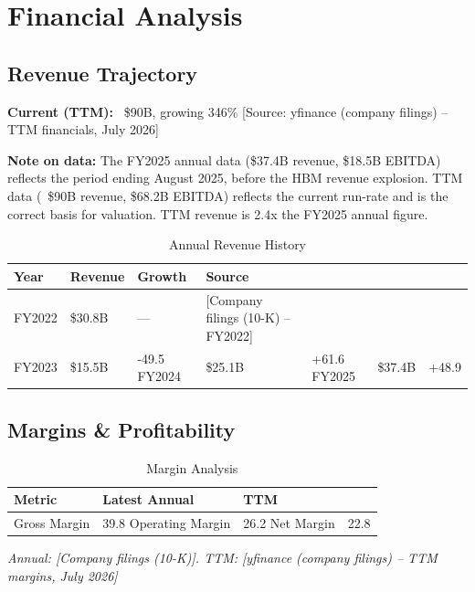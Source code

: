 \documentclass[11pt,a4paper]{report}
\newcommand{\source}[1]{\hfill\small\textit{#1}}
\begin{document}
\chapter{Financial Analysis}

\section{Revenue Trajectory}
\textbf{Current (TTM):} ~\$90B, growing 346\% [Source: yfinance (company filings) -- TTM financials, July 2026]

\textbf{Note on data:} The FY2025 annual data (\$37.4B revenue, \$18.5B EBITDA) reflects the period ending August 2025, before the HBM revenue explosion. TTM data (~\$90B revenue, \$68.2B EBITDA) reflects the current run-rate and is the correct basis for valuation. TTM revenue is 2.4x the FY2025 annual figure.

\begin{table}[H]
\centering
\caption{Annual Revenue History}
\begin{tabularx}{\textwidth}{lC{2.5cm}C{2.5cm}X}
\toprule
\textbf{Year} & \textbf{Revenue} & \textbf{Growth} & \textbf{Source} \\
\midrule
FY2022 & \$30.8B & --- & [Company filings (10-K) -- FY2022] \\
FY2023 & \$15.5B & -49.5%
FY2024 & \$25.1B & +61.6%
FY2025 & \$37.4B & +48.9%
\bottomrule
\end{tabularx}
\end{table}

\section{Margins \& Profitability}
\begin{table}[H]
\centering
\caption{Margin Analysis}
\begin{tabularx}{\textwidth}{lC{2.5cm}C{2.5cm}}
\toprule
\textbf{Metric} & \textbf{Latest Annual} & \textbf{TTM} \\
\midrule
Gross Margin & 39.8%
Operating Margin & 26.2%
Net Margin & 22.8%
\bottomrule
\end{tabularx}
\source{Annual: [Company filings (10-K)]. TTM: [yfinance (company filings) -- TTM margins, July 2026]}
\end{table}
\end{document}
